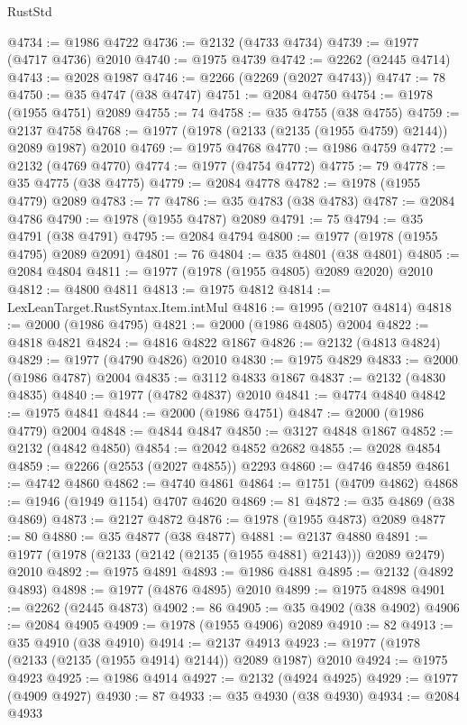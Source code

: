 \begin{lexlean}{RustStd}
\begin{coremodule}
@4734 := @1986 @4722
@4736 := @2132 (@4733 @4734)
@4739 := @1977 (@4717 @4736) @2010
@4740 := @1975 @4739
@4742 := @2262 (@2445 @4714)
@4743 := @2028 @1987
@4746 := @2266 (@2269 (@2027 @4743))
@4747 := 78
@4750 := @35 @4747 (@38 @4747)
@4751 := @2084 @4750
@4754 := @1978 (@1955 @4751) @2089
@4755 := 74
@4758 := @35 @4755 (@38 @4755)
@4759 := @2137 @4758
@4768 := @1977 (@1978 (@2133 (@2135 (@1955 @4759) @2144)) @2089 @1987) @2010
@4769 := @1975 @4768
@4770 := @1986 @4759
@4772 := @2132 (@4769 @4770)
@4774 := @1977 (@4754 @4772)
@4775 := 79
@4778 := @35 @4775 (@38 @4775)
@4779 := @2084 @4778
@4782 := @1978 (@1955 @4779) @2089
@4783 := 77
@4786 := @35 @4783 (@38 @4783)
@4787 := @2084 @4786
@4790 := @1978 (@1955 @4787) @2089
@4791 := 75
@4794 := @35 @4791 (@38 @4791)
@4795 := @2084 @4794
@4800 := @1977 (@1978 (@1955 @4795) @2089 @2091)
@4801 := 76
@4804 := @35 @4801 (@38 @4801)
@4805 := @2084 @4804
@4811 := @1977 (@1978 (@1955 @4805) @2089 @2020) @2010
@4812 := @4800 @4811
@4813 := @1975 @4812
@4814 := LexLeanTarget.RustSyntax.Item.intMul
@4816 := @1995 (@2107 @4814)
@4818 := @2000 (@1986 @4795)
@4821 := @2000 (@1986 @4805) @2004
@4822 := @4818 @4821
@4824 := @4816 @4822 @1867
@4826 := @2132 (@4813 @4824)
@4829 := @1977 (@4790 @4826) @2010
@4830 := @1975 @4829
@4833 := @2000 (@1986 @4787) @2004
@4835 := @3112 @4833 @1867
@4837 := @2132 (@4830 @4835)
@4840 := @1977 (@4782 @4837) @2010
@4841 := @4774 @4840
@4842 := @1975 @4841
@4844 := @2000 (@1986 @4751)
@4847 := @2000 (@1986 @4779) @2004
@4848 := @4844 @4847
@4850 := @3127 @4848 @1867
@4852 := @2132 (@4842 @4850)
@4854 := @2042 @4852 @2682
@4855 := @2028 @4854
@4859 := @2266 (@2553 (@2027 @4855)) @2293
@4860 := @4746 @4859
@4861 := @4742 @4860
@4862 := @4740 @4861
@4864 := @1751 (@4709 @4862)
@4868 := @1946 (@1949 @1154) @4707 @4620
@4869 := 81
@4872 := @35 @4869 (@38 @4869)
@4873 := @2127 @4872
@4876 := @1978 (@1955 @4873) @2089
@4877 := 80
@4880 := @35 @4877 (@38 @4877)
@4881 := @2137 @4880
@4891 := @1977 (@1978 (@2133 (@2142 (@2135 (@1955 @4881) @2143))) @2089 @2479) @2010
@4892 := @1975 @4891
@4893 := @1986 @4881
@4895 := @2132 (@4892 @4893)
@4898 := @1977 (@4876 @4895) @2010
@4899 := @1975 @4898
@4901 := @2262 (@2445 @4873)
@4902 := 86
@4905 := @35 @4902 (@38 @4902)
@4906 := @2084 @4905
@4909 := @1978 (@1955 @4906) @2089
@4910 := 82
@4913 := @35 @4910 (@38 @4910)
@4914 := @2137 @4913
@4923 := @1977 (@1978 (@2133 (@2135 (@1955 @4914) @2144)) @2089 @1987) @2010
@4924 := @1975 @4923
@4925 := @1986 @4914
@4927 := @2132 (@4924 @4925)
@4929 := @1977 (@4909 @4927)
@4930 := 87
@4933 := @35 @4930 (@38 @4930)
@4934 := @2084 @4933

\end{coremodule}
\end{lexlean}
